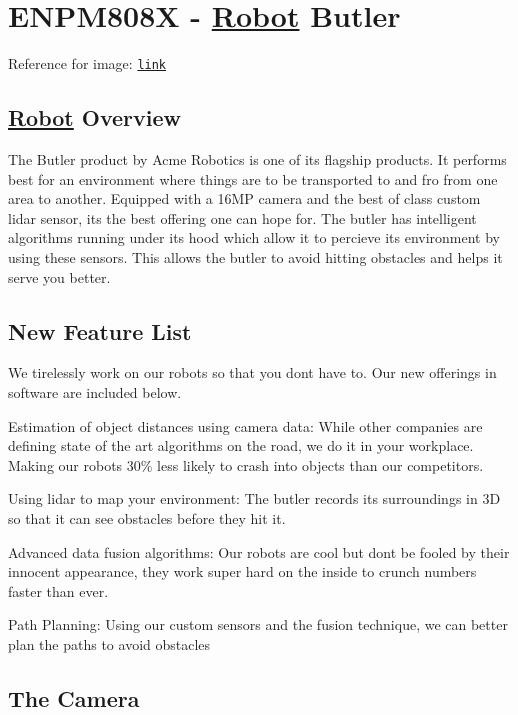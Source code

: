 \section*{E\+N\+P\+M808X -\/ \hyperlink{class_robot}{Robot} Butler }

\href{https://travis-ci.org/karanvivekbhargava/robot-butler-enpm808x}{\tt } \href{https://coveralls.io/github/karanvivekbhargava/robot-butler-enpm808x?branch=master}{\tt } \href{https://opensource.org/licenses/MIT}{\tt } 

 Reference for image\+: \href{http://www.savioke.com/}{\tt link} 

\subsection*{\hyperlink{class_robot}{Robot} Overview}

The Butler product by Acme Robotics is one of its flagship products. It performs best for an environment where things are to be transported to and fro from one area to another. Equipped with a 16\+MP camera and the best of class custom lidar sensor, its the best offering one can hope for. The butler has intelligent algorithms running under its hood which allow it to percieve its environment by using these sensors. This allows the butler to avoid hitting obstacles and helps it serve you better.

\subsection*{New Feature List}

We tirelessly work on our robots so that you don\textquotesingle{}t have to. Our new offerings in software are included below.
\begin{DoxyItemize}
\item Estimation of object distances using camera data\+: While other companies are defining state of the art algorithms on the road, we do it in your workplace. Making our robots 30\% less likely to crash into objects than our competitors.
\item Using lidar to map your environment\+: The butler records its surroundings in 3D so that it can see obstacles before they hit it.
\item Advanced data fusion algorithms\+: Our robots are cool but don\textquotesingle{}t be fooled by their innocent appearance, they work super hard on the inside to crunch numbers faster than ever.
\item Path Planning\+: Using our custom sensors and the fusion technique, we can better plan the paths to avoid obstacles 

 \subsection*{The Camera}
\end{DoxyItemize}

